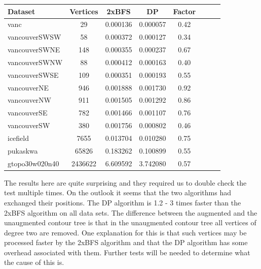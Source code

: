 \begin{center}
\begin{tabular}{l*{6}{c}r}
Dataset                & Vertices                    & 2xBFS                             & DP                    & Factor \\
\hline
vanc	               & 29    	                     & 0.000136	                         & 0.000057	              & 0.42  \\
vancouverSWSW	       & 58   	                     & 0.000372	                         & 0.000127	              & 0.34  \\
vancouverSWNE	       & 148  	                     & 0.000355	                         & 0.000237	              & 0.67  \\
vancouverSWNW	       & 88   	                     & 0.000412	                         & 0.000163	              & 0.40  \\
vancouverSWSE	       & 109  	                     & 0.000351	                         & 0.000193	              & 0.55  \\
vancouverNE	           & 946    	                 & 0.001888	                         & 0.001730	              & 0.92  \\
vancouverNW	           & 911    	                 & 0.001505	                         & 0.001292	              & 0.86  \\
vancouverSE	           & 782    	                 & 0.001466	                         & 0.001107	              & 0.76  \\
vancouverSW	           & 380    	                 & 0.001756	                         & 0.000802	              & 0.46  \\
icefield	           & 7655  	                     & 0.013704	                         & 0.010280	              & 0.75  \\
pukaskwa	           & 65826 	                     & 0.183262	                         & 0.100899	              & 0.55  \\
gtopo30w020n40	       & 2436622 	                 & 6.609592	                         & 3.742080	              & 0.57  \\

\end{tabular}
\end{center}

The results here are quite surprising and they required us to double check the test multiple times. On the outlook it seems that the two algorithms had exchanged their positions. The DP algorithm is 1.2 - 3 times faster than the 2xBFS algorithm on all data sets. The difference between the augmented and the unaugmented contour tree is that in the unaugmented contour tree all vertices of degree two are removed. One explanation for this is that
such vertices may be processed faster by the 2xBFS algorithm and that the DP algorithm has some overhead associated with them. Further tests will be needed to determine what the cause of this is.


